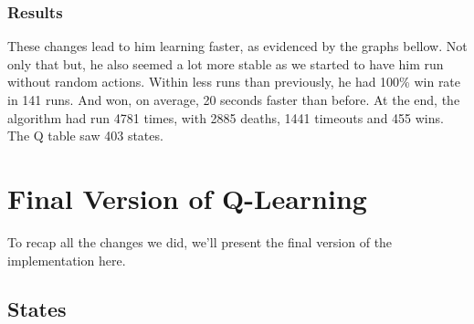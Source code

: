 \documentclass{article}
\begin{document}
  \subsubsection{Results}

  These changes lead to him learning faster, as evidenced by the graphs bellow.
  Not only that but, he also seemed a lot more stable as we started to have him run without random actions. Within less runs than previously, he had 100\% win rate in 141 runs. And won, on average, 20 seconds faster than before. At the end, the algorithm had run 4781 times, with 2885 deaths, 1441 timeouts and 455 wins. The Q table saw 403 states.

  \section{Final Version of Q-Learning}

  To recap all the changes we did, we'll present the final version of the implementation here.

  \subsection{States}
\end{document}
